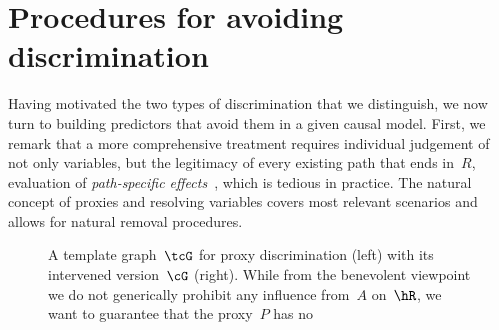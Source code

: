 \section{Procedures for avoiding discrimination}
\label{sec:criteria}

Having motivated the two types of discrimination that we distinguish, we now
turn to building predictors that avoid them in a given causal model. First, we
remark that a more comprehensive treatment requires individual judgement of not
only variables, but the legitimacy of every existing path that ends in~$R$,
\ie{} evaluation of \emph{path-specific effects}~\cite{Zhang2017b, Nabi2017},
which is tedious in practice. The natural concept of proxies and resolving
variables covers most relevant scenarios and allows for natural removal
procedures.

\begin{figure}
\begin{center}
  \begin{minipage}{0.5\textwidth}
    \hspace{0.5cm}
    \caption{A template graph~$\tcG$ for proxy discrimination (left) with its
    intervened version~$\cG$ (right). While from the benevolent viewpoint we do not generically prohibit any
    influence from~$A$ on~$\hR$, we want to guarantee that the proxy~$P$ has no
}
\end{minipage}
\end{center}
\end{figure}
